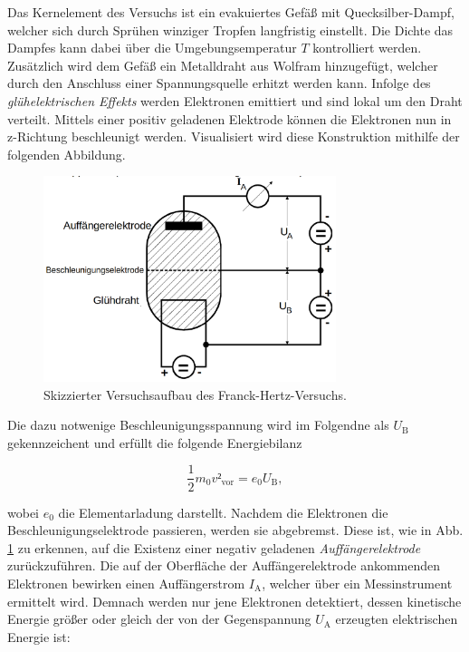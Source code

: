 \noindent Das Kernelement des Versuchs ist ein evakuiertes Gefäß mit Quecksilber-Dampf, welcher sich durch Sprühen winziger Tropfen langfristig einstellt.
Die Dichte das Dampfes kann dabei über die Umgebungsemperatur $T$ kontrolliert werden. Zusätzlich wird dem Gefäß ein Metalldraht aus Wolfram hinzugefügt, welcher 
durch den Anschluss einer Spannungsquelle erhitzt werden kann. Infolge des \emph{glühelektrischen Effekts} werden Elektronen emittiert und sind lokal 
um den Draht verteilt. Mittels einer positiv geladenen Elektrode können die Elektronen nun in z-Richtung beschleunigt werden. Visualisiert wird diese 
Konstruktion mithilfe der folgenden Abbildung.

\begin{figure}[H]
    \centering
    \includegraphics[height=6cm]{FH_Skizze.png}
    \caption{Skizzierter Versuchsaufbau des Franck-Hertz-Versuchs\cite{Versuchsanleitung_v601}.}
    \label{fig:FH_Skizze}
\end{figure}

\noindent Die dazu notwenige Beschleunigungsspannung wird im Folgendne als $U_\text{B}$ gekennzeichent und erfüllt die folgende Energiebilanz

\begin{equation*}
    \frac{1}{2}m_0v²_\text{vor} = e_0U_\text{B},
\end{equation*}

\noindent wobei $e_0$ die Elementarladung darstellt. Nachdem die Elektronen die Beschleunigungselektrode passieren, werden sie abgebremst. Diese ist, wie 
in Abb. \ref{fig:FH_Skizze} zu erkennen, auf die Existenz einer negativ geladenen \emph{Auffängerelektrode} zurückzuführen. Die auf der Oberfläche der
Auffängerelektrode ankommenden Elektronen bewirken einen Auffängerstrom $I_\text{A}$, welcher über ein Messinstrument ermittelt wird. Demnach werden nur 
jene Elektronen detektiert, dessen kinetische Energie größer oder gleich der von der Gegenspannung $U_\text{A}$ erzeugten elektrischen Energie ist:

